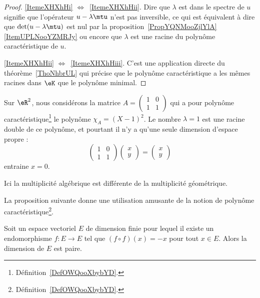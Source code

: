 \begin{proof}
    \ref{ItemeXHXhHi} \( \Leftrightarrow\)~\ref{ItemeXHXhHii}. Dire que \( \lambda\) est dans le spectre de \( u\) signifie que l'opérateur \( u-\lambda\mtu\) n'est pas inversible, ce qui est équivalent à dire que \( \det(u-\lambda\mtu)\) est nul par la proposition~\ref{PropYQNMooZjlYlA}\ref{ItemUPLNooYZMRJy} ou encore que \( \lambda\) est une racine du polynôme caractéristique de \( u\).

    \ref{ItemeXHXhHii} \( \Leftrightarrow\)~\ref{ItemeXHXhHiii}. C'est une application directe du théorème~\ref{ThoNhbrUL} qui précise que le polynôme caractéristique a les mêmes racines dans \(\eK\) que le polynôme minimal.
\end{proof}

\begin{example} \label{ExICOJcFp}
    Sur \( \eR^2\), nous considérons la matrice \( A=\begin{pmatrix}
        1    &   0    \\
        1    &   1
    \end{pmatrix}\) qui a pour polynôme caractéristique\footnote{Définition~\ref{DefOWQooXbybYD}.} le polynôme \( \chi_A=(X-1)^2\). Le nombre \( \lambda=1\) est une racine double de ce polynôme, et pourtant il n'y a qu'une seule dimension d'espace propre :
    \begin{equation}
        \begin{pmatrix}
            1    &   0    \\
            1    &   1
        \end{pmatrix}\begin{pmatrix}
            x    \\
            y
        \end{pmatrix}=\begin{pmatrix}
            x    \\
            y
        \end{pmatrix}
    \end{equation}
    entraine \( x=0\).

    Ici la multiplicité algébrique est différente de la multiplicité géométrique.
\end{example}

La proposition suivante donne une utilisation amusante de la notion de polynôme caractéristique\footnote{Définition~\ref{DefOWQooXbybYD}.}.
\begin{proposition}      \label{PROPooKJWOooOjSFaA}
    Soit un espace vectoriel \( E\) de dimension finie pour lequel il existe un endomorphisme \( f\colon E\to E\) tel que \( (f\circ f)(x)=-x\) pour tout \( x\in E\). Alors la dimension de \( E\) est paire.
\end{proposition}

